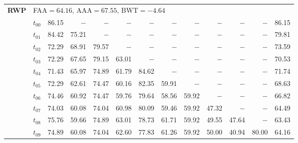 \begin{table}[ht]
\begin{tabular}{@{}l l r r r r r r r r r r r@{}}
\midrule
\multirow{11}{*}{\textbf{RWP}} & \multicolumn{12}{l}{\quad\small FAA$=64.16$,\; AAA$=67.55$,\; BWT$=-4.64$} \\
 & $t_{00}$ & 86.15 & $-$ & $-$ & $-$ & $-$ & $-$ & $-$ & $-$ & $-$ & $-$ & 86.15 \\
 & $t_{01}$ & 84.42 & 75.21 & $-$ & $-$ & $-$ & $-$ & $-$ & $-$ & $-$ & $-$ & 79.81 \\
 & $t_{02}$ & 72.29 & 68.91 & 79.57 & $-$ & $-$ & $-$ & $-$ & $-$ & $-$ & $-$ & 73.59 \\
 & $t_{03}$ & 72.29 & 67.65 & 79.15 & 63.01 & $-$ & $-$ & $-$ & $-$ & $-$ & $-$ & 70.53 \\
 & $t_{04}$ & 71.43 & 65.97 & 74.89 & 61.79 & 84.62 & $-$ & $-$ & $-$ & $-$ & $-$ & 71.74 \\
 & $t_{05}$ & 72.29 & 62.61 & 74.47 & 60.16 & 82.35 & 59.91 & $-$ & $-$ & $-$ & $-$ & 68.63 \\
 & $t_{06}$ & 74.46 & 60.92 & 74.47 & 59.76 & 79.64 & 58.56 & 59.92 & $-$ & $-$ & $-$ & 66.82 \\
 & $t_{07}$ & 74.03 & 60.08 & 74.04 & 60.98 & 80.09 & 59.46 & 59.92 & 47.32 & $-$ & $-$ & 64.49 \\
 & $t_{08}$ & 75.76 & 59.66 & 74.89 & 63.01 & 78.73 & 61.71 & 59.92 & 49.55 & 47.64 & $-$ & 63.43 \\
 & $t_{09}$ & 74.89 & 60.08 & 74.04 & 62.60 & 77.83 & 61.26 & 59.92 & 50.00 & 40.94 & 80.00 & 64.16 \\
\bottomrule
\end{tabular}
\end{table}
